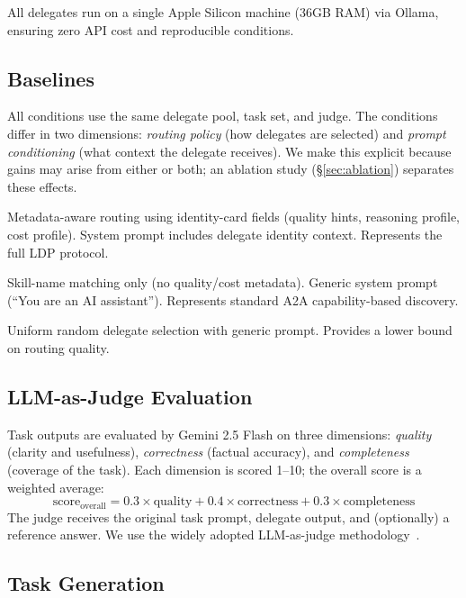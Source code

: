 \documentclass[11pt,a4paper]{article}
\newcommand{\ldp}{\textsc{LDP}}
\newcommand{\atoa}{\textsc{A2A}}
\begin{document}
\noindent All delegates run on a single Apple Silicon machine (36GB RAM) via Ollama, ensuring zero API cost and reproducible conditions.

\subsection{Baselines}

All conditions use the same delegate pool, task set, and judge. The conditions differ in two dimensions: \emph{routing policy} (how delegates are selected) and \emph{prompt conditioning} (what context the delegate receives). We make this explicit because gains may arise from either or both; an ablation study (\S\ref{sec:ablation}) separates these effects.

\begin{description}[leftmargin=0pt]
\item[\ldp{} Baseline.] Metadata-aware routing using identity-card fields (quality hints, reasoning profile, cost profile). System prompt includes delegate identity context. Represents the full \ldp{} protocol.
\item[\atoa{} Baseline.] Skill-name matching only (no quality/cost metadata). Generic system prompt (``You are an AI assistant''). Represents standard \atoa{} capability-based discovery.
\item[Random Baseline.] Uniform random delegate selection with generic prompt. Provides a lower bound on routing quality.
\end{description}

\subsection{LLM-as-Judge Evaluation}

Task outputs are evaluated by Gemini 2.5 Flash on three dimensions: \emph{quality} (clarity and usefulness), \emph{correctness} (factual accuracy), and \emph{completeness} (coverage of the task). Each dimension is scored 1--10; the overall score is a weighted average:
\begin{equation}
\text{score}_{\text{overall}} = 0.3 \times \text{quality} + 0.4 \times \text{correctness} + 0.3 \times \text{completeness}
\label{eq:scoring}
\end{equation}
The judge receives the original task prompt, delegate output, and (optionally) a reference answer. We use the widely adopted LLM-as-judge methodology~\citep{zheng2023judging}.

\subsection{Task Generation}
\end{document}
